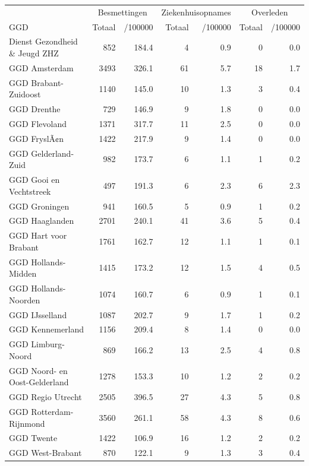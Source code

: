 \documentclass[
  english,
  man,floatsintext]{apa6}
\begin{document}
\begin{table}
\centering\begingroup\fontsize{10}{12}\selectfont

\begin{threeparttable}
\begin{tabular}{lrrrrrr}
\toprule
\multicolumn{1}{c}{ } & \multicolumn{2}{c}{Besmettingen} & \multicolumn{2}{c}{Ziekenhuisopnames} & \multicolumn{2}{c}{Overleden} \\
\cmidrule(l{3pt}r{3pt}){2-3} \cmidrule(l{3pt}r{3pt}){4-5} \cmidrule(l{3pt}r{3pt}){6-7}
GGD & Totaal & /100000 & Totaal & /100000 & Totaal & /100000\\
\midrule
Dienst Gezondheid \& Jeugd ZHZ & 852 & 184.4 & 4 & 0.9 & 0 & 0.0\\
GGD Amsterdam & 3493 & 326.1 & 61 & 5.7 & 18 & 1.7\\
GGD Brabant-Zuidoost & 1140 & 145.0 & 10 & 1.3 & 3 & 0.4\\
GGD Drenthe & 729 & 146.9 & 9 & 1.8 & 0 & 0.0\\
GGD Flevoland & 1371 & 317.7 & 11 & 2.5 & 0 & 0.0\\
GGD FryslÃ¢n & 1422 & 217.9 & 9 & 1.4 & 0 & 0.0\\
GGD Gelderland-Zuid & 982 & 173.7 & 6 & 1.1 & 1 & 0.2\\
GGD Gooi en Vechtstreek & 497 & 191.3 & 6 & 2.3 & 6 & 2.3\\
GGD Groningen & 941 & 160.5 & 5 & 0.9 & 1 & 0.2\\
GGD Haaglanden & 2701 & 240.1 & 41 & 3.6 & 5 & 0.4\\
GGD Hart voor Brabant & 1761 & 162.7 & 12 & 1.1 & 1 & 0.1\\
GGD Hollands-Midden & 1415 & 173.2 & 12 & 1.5 & 4 & 0.5\\
GGD Hollands-Noorden & 1074 & 160.7 & 6 & 0.9 & 1 & 0.1\\
GGD IJsselland & 1087 & 202.7 & 9 & 1.7 & 1 & 0.2\\
GGD Kennemerland & 1156 & 209.4 & 8 & 1.4 & 0 & 0.0\\
GGD Limburg-Noord & 869 & 166.2 & 13 & 2.5 & 4 & 0.8\\
GGD Noord- en Oost-Gelderland & 1278 & 153.3 & 10 & 1.2 & 2 & 0.2\\
GGD Regio Utrecht & 2505 & 396.5 & 27 & 4.3 & 5 & 0.8\\
GGD Rotterdam-Rijnmond & 3560 & 261.1 & 58 & 4.3 & 8 & 0.6\\
GGD Twente & 1422 & 106.9 & 16 & 1.2 & 2 & 0.2\\
GGD West-Brabant & 870 & 122.1 & 9 & 1.3 & 3 & 0.4\\

\end{tabular}
\end{threeparttable}
\end{table}
\end{document}
